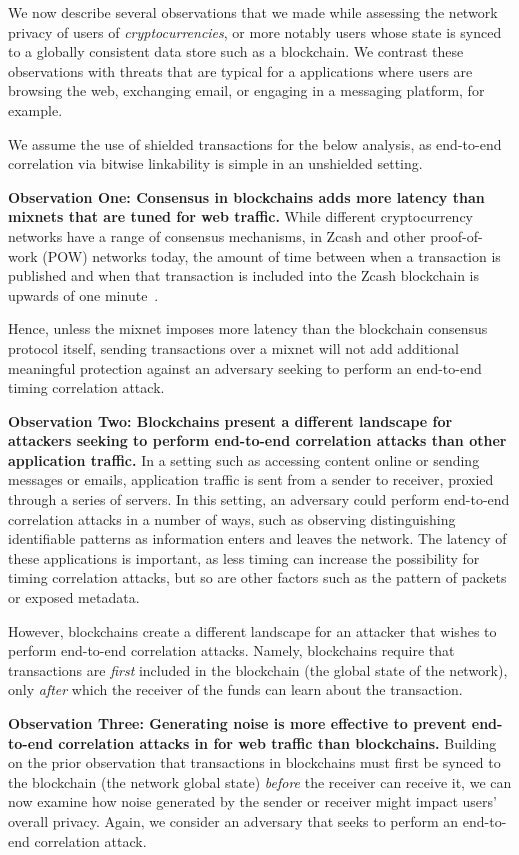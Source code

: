 \documentclass{article}
\begin{document}
We now describe several observations that we made while assessing the network
privacy of users of \emph{cryptocurrencies}, or more notably users whose state
is synced to a globally consistent data store such as a blockchain. We contrast
these observations with threats that are typical for a applications where users
are browsing the web, exchanging email, or engaging in a messaging platform,
for example.

We assume the use of shielded transactions for the below analysis, as
end-to-end correlation via bitwise linkability is simple in an unshielded
setting.

\textbf{Observation One: Consensus in blockchains adds more latency than
mixnets that are tuned for web traffic.}
While different cryptocurrency networks have a range of consensus mechanisms,
in Zcash and other proof-of-work (POW) networks today, the amount of time
between when a transaction is published and when that transaction is included
into the Zcash blockchain is upwards of one minute~\cite{zcash-faq}.

Hence, unless the mixnet imposes more latency than the blockchain consensus
protocol itself, sending transactions over a mixnet will not add additional
meaningful protection against an adversary seeking to perform an end-to-end
timing correlation attack.

\textbf{Observation Two: Blockchains present a different landscape for
attackers seeking to perform end-to-end correlation attacks than other
application traffic.}
In a setting such as accessing content online or sending messages or emails,
application traffic is sent from a sender to receiver, proxied through a series
of servers. In this setting, an adversary could perform end-to-end correlation
attacks in a number of ways, such as observing distinguishing identifiable
patterns as information enters and leaves the network. The latency of these
applications is important, as less timing can increase the possibility for
timing correlation attacks, but so are other factors such as the pattern of
packets or exposed metadata.

However, blockchains create a different landscape for an attacker that
wishes to perform end-to-end correlation attacks. Namely, blockchains require
that transactions are \emph{first} included in the blockchain (the global state
of the network), only \emph{after} which the receiver of the funds can learn
about the transaction.

\textbf{Observation Three: Generating noise is more effective to prevent
end-to-end correlation attacks in for web traffic than blockchains.}
Building on the prior observation that transactions in blockchains must first
be synced to the blockchain (the network global state) \emph{before} the
receiver can receive it, we can now examine how noise generated by the sender
or receiver might impact users' overall privacy. Again, we consider an
adversary that seeks to perform an end-to-end correlation attack.
\end{document}
